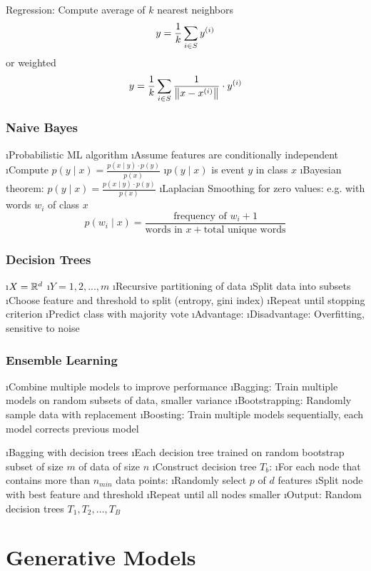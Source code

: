 Regression: Compute average of $k$ nearest neighbors \[y = \frac{1}{k} \displaystyle\sum_{i \in S} y^{(i)}\] or weighted \[y = \frac{1}{k} \displaystyle\sum_{i \in S} \frac{1}{\left\lVert x-x^{(i)}\right\rVert} \cdot y^{(i)}\]

\subsubsection{Naive Bayes}

\bi
\i Probabilistic ML algorithm
\i Assume features are conditionally independent
\i Compute $p(y \mid x) = \frac{p(x \mid y) \cdot p(y)}{p(x)}$
\i $p(y \mid x)$ is event $y$ in class $x$
\i Bayesian theorem: $p(y \mid x) = \frac{p(x \mid y) \cdot p(y)}{p(x)}$
\i Laplacian Smoothing for zero values: e.g. with words $w_i$ of class $x$ \[
p(w_i \mid x) = \frac{\text{frequency of $w_i$} +1 }{\text{words in $x$} + \text{total unique words}}
\]
\ei

\subsubsection{Decision Trees}

\bi
\i $X = \mathbb{R}^d$
\i $Y = {1,2,...,m}$
\i Recursive partitioning of data
\i Split data into subsets
\i Choose feature and threshold to split (entropy, gini index)
\i Repeat until stopping criterion
\i Predict class with majority vote
\i Advantage:
\i Disadvantage: Overfitting, sensitive to noise
\ei

\subsubsection{Ensemble Learning}

\bi
\i Combine multiple models to improve performance
\i Bagging: Train multiple models on random subsets of data, smaller variance
\i Bootstrapping: Randomly sample data with replacement
\i Boosting: Train multiple models sequentially, each model corrects previous model
\ei


\bi
\i Bagging with decision trees
\i Each decision tree trained on random bootstrap subset of size $m$ of data of size $n$
\i Construct decision tree $T_b$:
\bi
\i For each node that contains more than $n_{min}$ data points:
\i Randomly select $p$ of $d$ features
\i Split node with best feature and threshold
\i Repeat until all nodes smaller
\ei
\i Output: Random decision trees $T_1, T_2, \ldots, T_B$
\ei

\section{Generative Models}

